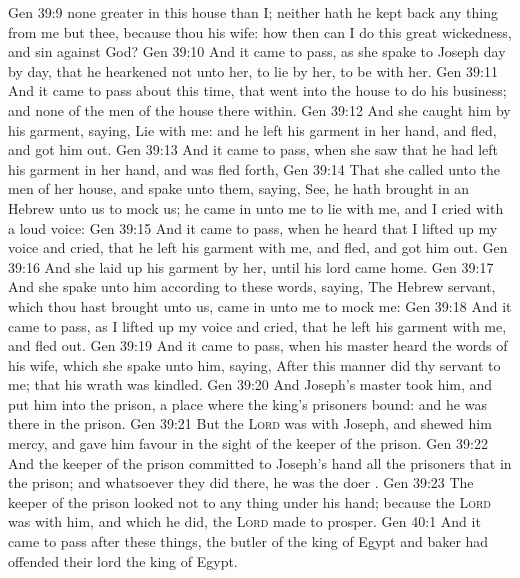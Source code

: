 \vs Gen 39:9  none greater in this house than I; neither hath he kept back any thing from me but thee, because thou  his wife: how then can I do this great wickedness, and sin against God?
\vs Gen 39:10 And it came to pass, as she spake to Joseph day by day, that he hearkened not unto her, to lie by her,  to be with her.
\vs Gen 39:11 And it came to pass about this time, that  went into the house to do his business; and  none of the men of the house there within.
\vs Gen 39:12 And she caught him by his garment, saying, Lie with me: and he left his garment in her hand, and fled, and got him out.
\vs Gen 39:13 And it came to pass, when she saw that he had left his garment in her hand, and was fled forth,
\vs Gen 39:14 That she called unto the men of her house, and spake unto them, saying, See, he hath brought in an Hebrew unto us to mock us; he came in unto me to lie with me, and I cried with a loud voice:
\vs Gen 39:15 And it came to pass, when he heard that I lifted up my voice and cried, that he left his garment with me, and fled, and got him out.
\vs Gen 39:16 And she laid up his garment by her, until his lord came home.
\vs Gen 39:17 And she spake unto him according to these words, saying, The Hebrew servant, which thou hast brought unto us, came in unto me to mock me:
\vs Gen 39:18 And it came to pass, as I lifted up my voice and cried, that he left his garment with me, and fled out.
\vs Gen 39:19 And it came to pass, when his master heard the words of his wife, which she spake unto him, saying, After this manner did thy servant to me; that his wrath was kindled.
\vs Gen 39:20 And Joseph's master took him, and put him into the prison, a place where the king's prisoners  bound: and he was there in the prison.
\vs Gen 39:21 But the \textsc{Lord} was with Joseph, and shewed him mercy, and gave him favour in the sight of the keeper of the prison.
\vs Gen 39:22 And the keeper of the prison committed to Joseph's hand all the prisoners that  in the prison; and whatsoever they did there, he was the doer .
\vs Gen 39:23 The keeper of the prison looked not to any thing  under his hand; because the \textsc{Lord} was with him, and  which he did, the \textsc{Lord} made  to prosper.
\vs Gen 40:1 And it came to pass after these things,  the butler of the king of Egypt and  baker had offended their lord the king of Egypt.
